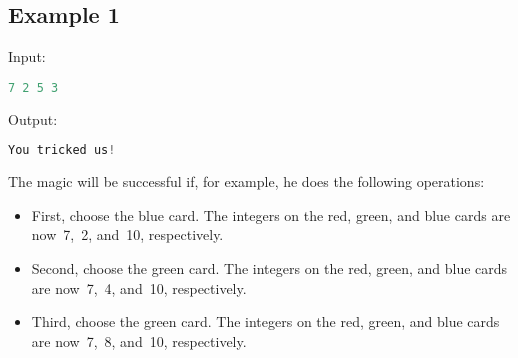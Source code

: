 \documentclass[10pt]{article}
\begin{document}
\subsection{Example 1}
Input:
\begin{lstlisting}[language=Python]
7 2 5 3 
\end{lstlisting}
Output:
\begin{lstlisting}[language=Python]
You tricked us!
\end{lstlisting}
The magic will be successful if, for example, he does the following operations:
\begin{itemize}
\item First, choose the blue card. The integers on the red, green, and blue cards are now 7, 2, and 10, respectively.
\item Second, choose the green card. The integers on the red, green, and blue cards are now 7, 4, and 10, respectively.
\item Third, choose the green card. The integers on the red, green, and blue cards are now 7, 8, and 10, respectively.
\end{itemize}
\end{document}
